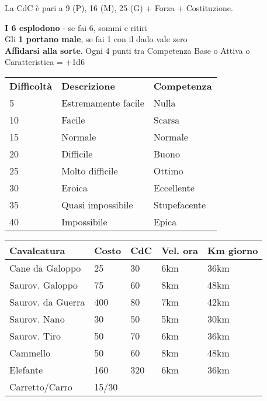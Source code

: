 \documentclass[landscape,10pt,a4paper]{article}
\begin{document}
\begin{multicols}{3}
\begin{dmbox}[title=Capacità di Carico - pagina \pageref{capacitadicarico}]
La CdC è pari a 9 (P), 16 (M), 25 (G) + Forza + Costituzione.
\end{dmbox}


\begin{dmbox}[title=Golden Rules - pagina \pageref{goldenrules}]
{\textbf{I 6 esplodono}} - se fai 6, sommi e ritiri\\
Gli \textbf{1 portano male}, se fai 1 con il dado vale zero\\
\textbf{Affidarsi alla sorte}. Ogni 4 punti tra Competenza Base o Attiva o Caratteristica = +1d6
\end{dmbox}



\begin{dmbox}[title=Difficoltà e Competenza - pagina \pageref{basedifficolta}]
\begin{tabular}{lll}
\textbf{Difficoltà} & \textbf{Descrizione} & \textbf{Competenza} \\
5 & Estremamente facile  & Nulla\\
10  & Facile & Scarsa\\
15  & Normale  & Normale\\
20  & Difficile  & Buono\\
25  & Molto difficile  & Ottimo\\
30  & Eroica   & Eccellente\\
35  & Quasi impossibile & Stupefacente\\
40  & Impossibile  & Epica\\
\end{tabular}
\end{dmbox}



\begin{dmbox}[title=Cavalcature/Costo/Movimento - pagina \pageref{costicavalcature} - \pageref{tabella-cavalcature-e-veicoli} - \pageref{tipodimovimento}]

\begin{tabularx}{1\textwidth}{lllXX}
\textbf{Cavalcatura} & \textbf{Costo} & \textbf{CdC} & \textbf{Vel. ora} & \textbf{Km giorno}\\
\toprule
Cane da Galoppo &25&30&6km & 36km \\
Saurov. Galoppo&75&60&8km & 48km \\
Saurov. da Guerra &400&80&7km & 42km \\
Saurov. Nano&30&50&5km & 30km \\
Saurov. Tiro&50&70&6km & 36km \\
Cammello&50&60&8km & 48km \\
Elefante&160&320&6km & 36km \\
Carretto/Carro  &15/30 & &&
\end{tabularx}


\end{dmbox}
\end{multicols}
\end{document}
